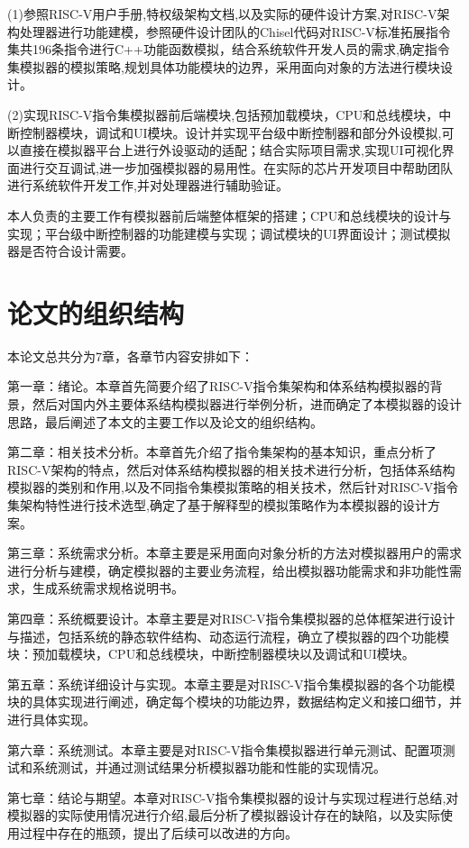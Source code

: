 (1)参照RISC-V用户手册,特权级架构文档,以及实际的硬件设计方案,对RISC-V架构处理器进行功能建模，参照硬件设计团队的Chisel代码对RISC-V标准拓展指令集共196条指令进行C++功能函数模拟，结合系统软件开发人员的需求,确定指令集模拟器的模拟策略,规划具体功能模块的边界，采用面向对象的方法进行模块设计。


(2)实现RISC-V指令集模拟器前后端模块,包括预加载模块，CPU和总线模块，中断控制器模块，调试和UI模块。设计并实现平台级中断控制器和部分外设模拟,可以直接在模拟器平台上进行外设驱动的适配；结合实际项目需求,实现UI可视化界面进行交互调试,进一步加强模拟器的易用性。在实际的芯片开发项目中帮助团队进行系统软件开发工作,并对处理器进行辅助验证。


本人负责的主要工作有模拟器前后端整体框架的搭建；CPU和总线模块的设计与实现；平台级中断控制器的功能建模与实现；调试模块的UI界面设计；测试模拟器是否符合设计需要。


\section{论文的组织结构}
本论文总共分为7章，各章节内容安排如下：


第一章：绪论。本章首先简要介绍了RISC-V指令集架构和体系结构模拟器的背景，然后对国内外主要体系结构模拟器进行举例分析，进而确定了本模拟器的设计思路，最后阐述了本文的主要工作以及论文的组织结构。


第二章：相关技术分析。本章首先介绍了指令集架构的基本知识，重点分析了RISC-V架构的特点，然后对体系结构模拟器的相关技术进行分析，包括体系结构模拟器的类别和作用,以及不同指令集模拟策略的相关技术，然后针对RISC-V指令集架构特性进行技术选型,确定了基于解释型的模拟策略作为本模拟器的设计方案。


第三章：系统需求分析。本章主要是采用面向对象分析的方法对模拟器用户的需求进行分析与建模，确定模拟器的主要业务流程，给出模拟器功能需求和非功能性需求，生成系统需求规格说明书。


第四章：系统概要设计。本章主要是对RISC-V指令集模拟器的总体框架进行设计与描述，包括系统的静态软件结构、动态运行流程，确立了模拟器的四个功能模块：预加载模块，CPU和总线模块，中断控制器模块以及调试和UI模块。


第五章：系统详细设计与实现。本章主要是对RISC-V指令集模拟器的各个功能模块的具体实现进行阐述，确定每个模块的功能边界，数据结构定义和接口细节，并进行具体实现。


第六章：系统测试。本章主要是对RISC-V指令集模拟器进行单元测试、配置项测试和系统测试，并通过测试结果分析模拟器功能和性能的实现情况。


第七章：结论与期望。本章对RISC-V指令集模拟器的设计与实现过程进行总结,对模拟器的实际使用情况进行介绍,最后分析了模拟器设计存在的缺陷，以及实际使用过程中存在的瓶颈，提出了后续可以改进的方向。


